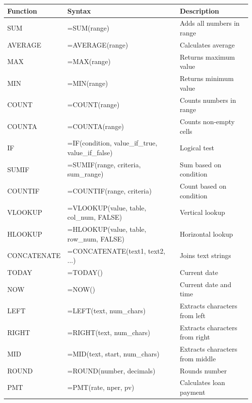 \documentclass[12pt,a4paper]{article}
\begin{document}
\begin{longtable}{|p{3cm}|p{4cm}|p{6cm}|}
\hline
\textbf{Function} & \textbf{Syntax} & \textbf{Description} \\
\hline
\endhead

SUM & =SUM(range) & Adds all numbers in range \\
\hline

AVERAGE & =AVERAGE(range) & Calculates average \\
\hline

MAX & =MAX(range) & Returns maximum value \\
\hline

MIN & =MIN(range) & Returns minimum value \\
\hline

COUNT & =COUNT(range) & Counts numbers in range \\
\hline

COUNTA & =COUNTA(range) & Counts non-empty cells \\
\hline

IF & =IF(condition, value\_if\_true, value\_if\_false) & Logical test \\
\hline

SUMIF & =SUMIF(range, criteria, sum\_range) & Sum based on condition \\
\hline

COUNTIF & =COUNTIF(range, criteria) & Count based on condition \\
\hline

VLOOKUP & =VLOOKUP(value, table, col\_num, FALSE) & Vertical lookup \\
\hline

HLOOKUP & =HLOOKUP(value, table, row\_num, FALSE) & Horizontal lookup \\
\hline

CONCATENATE & =CONCATENATE(text1, text2, ...) & Joins text strings \\
\hline

TODAY & =TODAY() & Current date \\
\hline

NOW & =NOW() & Current date and time \\
\hline

LEFT & =LEFT(text, num\_chars) & Extracts characters from left \\
\hline

RIGHT & =RIGHT(text, num\_chars) & Extracts characters from right \\
\hline

MID & =MID(text, start, num\_chars) & Extracts characters from middle \\
\hline

ROUND & =ROUND(number, decimals) & Rounds number \\
\hline

PMT & =PMT(rate, nper, pv) & Calculates loan payment \\
\hline

\end{longtable}
\end{document}

